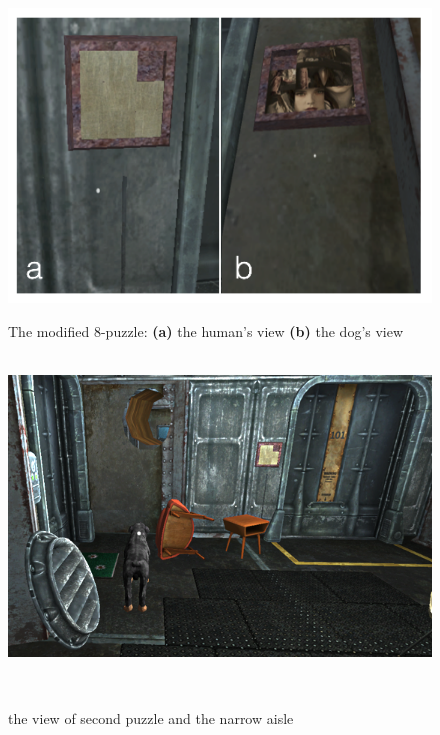 \documentclass{sigchi}
\begin{document}
\begin{figure}[H]
        \centering
        \includegraphics[width=\linewidth]{images/8puzzle.png}
        \caption{The modified 8-puzzle:  \textbf{(a)} the human's view \textbf{(b)}  the dog's view}
        \label{fig:8puzzle}
    \endminipage
    ~ %
        \centering
        \includegraphics[width=\linewidth]{images/puzzle2_view.png}
        \caption{the view of second puzzle and the narrow aisle}
        \label{fig:puzzle2_view}
    \endminipage
    ~ %
\end{figure}
\end{document}
